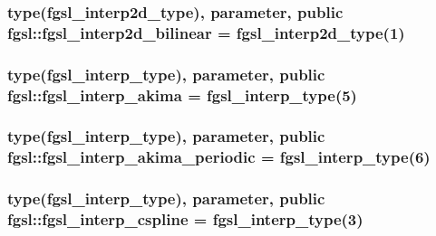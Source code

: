 \subsubsection[{fgsl\+\_\+interp2d\+\_\+bilinear}]{\setlength{\rightskip}{0pt plus 5cm}type({\bf fgsl\+\_\+interp2d\+\_\+type}), parameter, public fgsl\+::fgsl\+\_\+interp2d\+\_\+bilinear = {\bf fgsl\+\_\+interp2d\+\_\+type}(1)}\label{namespacefgsl_aaa41b206c74a9dd325809f55b148d24e}
\hypertarget{namespacefgsl_a7da81682e22860ff3f743dcf2e80b6e5}{}
\subsubsection[{fgsl\+\_\+interp\+\_\+akima}]{\setlength{\rightskip}{0pt plus 5cm}type({\bf fgsl\+\_\+interp\+\_\+type}), parameter, public fgsl\+::fgsl\+\_\+interp\+\_\+akima = {\bf fgsl\+\_\+interp\+\_\+type}(5)}\label{namespacefgsl_a7da81682e22860ff3f743dcf2e80b6e5}
\hypertarget{namespacefgsl_ae51f422b992227f64fb8505b62335502}{}
\subsubsection[{fgsl\+\_\+interp\+\_\+akima\+\_\+periodic}]{\setlength{\rightskip}{0pt plus 5cm}type({\bf fgsl\+\_\+interp\+\_\+type}), parameter, public fgsl\+::fgsl\+\_\+interp\+\_\+akima\+\_\+periodic = {\bf fgsl\+\_\+interp\+\_\+type}(6)}\label{namespacefgsl_ae51f422b992227f64fb8505b62335502}
\hypertarget{namespacefgsl_aa03de96a2a37daa1c2e464b98e198eb3}{}
\subsubsection[{fgsl\+\_\+interp\+\_\+cspline}]{\setlength{\rightskip}{0pt plus 5cm}type({\bf fgsl\+\_\+interp\+\_\+type}), parameter, public fgsl\+::fgsl\+\_\+interp\+\_\+cspline = {\bf fgsl\+\_\+interp\+\_\+type}(3)}\label{namespacefgsl_aa03de96a2a37daa1c2e464b98e198eb3}
\hypertarget{namespacefgsl_a383cf4d39acd2faf1d29a204d9349043}{}

